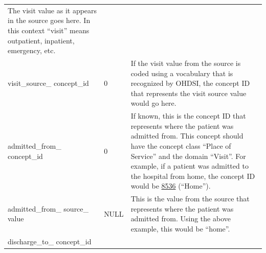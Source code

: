 \documentclass[11pt]{book}
\theoremstyle{definition}
\theoremstyle{definition}
\theoremstyle{definition}
\theoremstyle{remark}
\begin{document}
\begin{longtable}[]{@{}lll@{}}
\begin{minipage}[t]{0.49\columnwidth}
The visit value as it appears in the source goes here. In this context ``visit'' means outpatient, inpatient, emergency, etc.\strut
\end{minipage}\tabularnewline
\begin{minipage}[t]{0.28\columnwidth}\raggedright
visit\_source\_ concept\_id\strut
\end{minipage} & \begin{minipage}[t]{0.15\columnwidth}\raggedright
0\strut
\end{minipage} & \begin{minipage}[t]{0.49\columnwidth}\raggedright
If the visit value from the source is coded using a vocabulary that is recognized by OHDSI, the concept ID that represents the visit source value would go here.\strut
\end{minipage}\tabularnewline
\begin{minipage}[t]{0.28\columnwidth}\raggedright
admitted\_from\_ concept\_id\strut
\end{minipage} & \begin{minipage}[t]{0.15\columnwidth}\raggedright
0\strut
\end{minipage} & \begin{minipage}[t]{0.49\columnwidth}\raggedright
If known, this is the concept ID that represents where the patient was admitted from. This concept should have the concept class ``Place of Service'' and the domain ``Visit''. For example, if a patient was admitted to the hospital from home, the concept ID would be \href{http://athena.ohdsi.org/search-terms/terms/8536}{8536} (``Home'').\strut
\end{minipage}\tabularnewline
\begin{minipage}[t]{0.28\columnwidth}\raggedright
admitted\_from\_ source\_ value\strut
\end{minipage} & \begin{minipage}[t]{0.15\columnwidth}\raggedright
NULL\strut
\end{minipage} & \begin{minipage}[t]{0.49\columnwidth}\raggedright
This is the value from the source that represents where the patient was admitted from. Using the above example, this would be ``home''.\strut
\end{minipage}\tabularnewline
\begin{minipage}[t]{0.28\columnwidth}\raggedright
discharge\_to\_ concept\_id\strut
\end{minipage} & \begin{minipage}[t]{0.15\columnwidth}\raggedright

\end{minipage}
\end{longtable}
\end{document}
